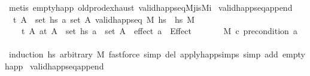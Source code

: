 \begin{isabellebody}
\ {\isacharparenleft}{\kern0pt}metis\ empty{\isacharunderscore}{\kern0pt}happ\ old{\isachardot}{\kern0pt}prod{\isachardot}{\kern0pt}exhaust\ valid{\isacharunderscore}{\kern0pt}happ{\isacharunderscore}{\kern0pt}seq{\isacharunderscore}{\kern0pt}M\isactrlsub j{\isacharunderscore}{\kern0pt}is{\isacharunderscore}{\kern0pt}M\isactrlsub i{\isacharparenright}{\kern0pt}{\isacharplus}{\kern0pt}%
\endisatagproof
{\isafoldproof}%
%
\isadelimproof
\isanewline
%
\endisadelimproof
\isanewline
{}\isamarkupfalse%
\ valid{\isacharunderscore}{\kern0pt}happ{\isacharunderscore}{\kern0pt}seq{\isacharunderscore}{\kern0pt}append{\isacharunderscore}{\kern0pt}{}{\isacharcolon}{\kern0pt}\isanewline
\ \ {\isachardoublequoteopen}{\isasymlbrakk}{\isacharparenleft}{\kern0pt}t{\isacharcomma}{\kern0pt}\ A{\isacharparenright}{\kern0pt}\ {\isasymin}\ set\ hs{}{\isacharsemicolon}{\kern0pt}\ a{\isasymin}\ set\ A{\isacharsemicolon}{\kern0pt}\ valid{\isacharunderscore}{\kern0pt}happ{\isacharunderscore}{\kern0pt}seq\ M\ {\isacharparenleft}{\kern0pt}hs{}\ {\isacharat}{\kern0pt}\ hs{}{\isacharparenright}{\kern0pt}\ M{\isacharprime}{\kern0pt}{\isacharsemicolon}{\kern0pt}\isanewline
\ \ \ \ {\isasymAnd}t\ A\ a{\isachardot}{\kern0pt}{\isasymlbrakk}{\isacharparenleft}{\kern0pt}t{\isacharcomma}{\kern0pt}\ A{\isacharparenright}{\kern0pt}\ {\isasymin}\ set\ hs{}{\isacharsemicolon}{\kern0pt}\ a\ {\isasymin}\ set\ A{\isasymrbrakk}\ {\isasymLongrightarrow}\ effect\ a\ {\isacharequal}{\kern0pt}\ Effect\ {\isacharbrackleft}{\kern0pt}{\isacharbrackright}{\kern0pt}\ {\isacharbrackleft}{\kern0pt}{\isacharbrackright}{\kern0pt}{\isasymrbrakk}\isanewline
\ \ \ \ {\isasymLongrightarrow}\ M\ \isactrlsup c{\isasymTTurnstile}\isactrlsub {\isacharequal}{\kern0pt}\ precondition\ a{\isachardoublequoteclose}\isanewline
%
\isadelimproof
\ \ %
\endisadelimproof
%
\isatagproof
{}\isamarkupfalse%
\ {\isacharparenleft}{\kern0pt}induction\ hs{}\ arbitrary{\isacharcolon}{\kern0pt}\ M{\isacharparenright}{\kern0pt}\ {\isacharparenleft}{\kern0pt}fastforce\ simp\ del{\isacharcolon}{\kern0pt}\ apply{\isacharunderscore}{\kern0pt}happ{\isachardot}{\kern0pt}simps\ simp\ add{\isacharcolon}{\kern0pt}\ empty{\isacharunderscore}{\kern0pt}happ{\isacharparenright}{\kern0pt}{\isacharplus}{\kern0pt}%
\endisatagproof
{\isafoldproof}%
%
\isadelimproof
\isanewline
%
\endisadelimproof
\isanewline
{}\isamarkupfalse%
\ valid{\isacharunderscore}{\kern0pt}happ{\isacharunderscore}{\kern0pt}seq{\isacharunderscore}{\kern0pt}append{\isacharunderscore}{\kern0pt}{}{\isacharcolon}{\kern0pt}\isanewline

\end{isabellebody}
